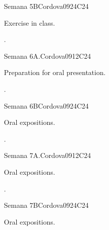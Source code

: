 \begin{syllabus}
\begin{unit}{Semana 5B}{}{Cordova09}{24}{C24}
   \begin{topics}
      \item Exercise in class.
   \end{topics}

   \begin{learningoutcomes}
      \item . 
      \end{learningoutcomes}
\end{unit}

\begin{unit}{Semana 6A.}{}{Cordova09}{12}{C24}
   \begin{topics}
      \item Preparation for oral presentation. 
   \end{topics}
   \begin{learningoutcomes}
      \item .
   \end{learningoutcomes}
\end{unit}

\begin{unit}{Semana 6B}{}{Cordova09}{24}{C24}
   \begin{topics}
      \item Oral expositions.
   \end{topics}

   \begin{learningoutcomes}
      \item .
      \end{learningoutcomes}
\end{unit}


\begin{unit}{Semana 7A.}{}{Cordova09}{12}{C24}
   \begin{topics}
      \item Oral expositions.
   \end{topics}
   \begin{learningoutcomes}
      \item .
   \end{learningoutcomes}
\end{unit}

\begin{unit}{Semana 7B}{}{Cordova09}{24}{C24}
   \begin{topics}
      \item Oral expositions.
   \end{topics}


\end{unit}
\end{syllabus}
